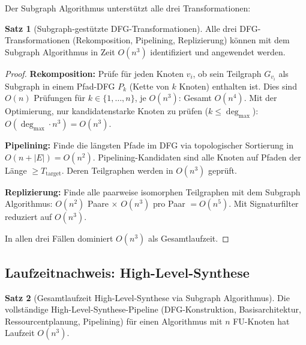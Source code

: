 ﻿\documentclass[a4paper,12pt]{article}
\theoremstyle{definition}
\newtheorem{satz}{Satz}
\begin{document}
Der Subgraph Algorithmus unterstützt alle drei Transformationen:

\begin{satz}[Subgraph-gestützte DFG-Transformationen]\label{satz:dfg_transform}
  Alle drei DFG-Transformationen (Rekomposition, Pipelining, Replizierung) können
  mit dem Subgraph Algorithmus in Zeit $O(n^3)$ identifiziert und angewendet werden.
\end{satz}

\begin{proof}
  \textbf{Rekomposition:} Prüfe für jeden Knoten $v_i$, ob sein Teilgraph $G_{v_i}$
  als Subgraph in einem Pfad-DFG $P_k$ (Kette von $k$ Knoten) enthalten ist. Dies sind
  $O(n)$ Prüfungen für $k \in \{1,\ldots,n\}$, je $O(n^3)$: Gesamt $O(n^4)$.
  Mit der Optimierung, nur kandidatenstarke Knoten zu prüfen ($k \leq \deg_{\max}$):
  $O(\deg_{\max} \cdot n^3) = O(n^3)$.

  \textbf{Pipelining:} Finde die längsten Pfade im DFG via topologischer Sortierung
  in $O(n + |E|) = O(n^2)$. Pipelining-Kandidaten sind alle Knoten auf Pfaden der
  Länge $\geq T_{\text{target}}$. Deren Teilgraphen werden in $O(n^3)$ geprüft.

  \textbf{Replizierung:} Finde alle paarweise isomorphen Teilgraphen mit dem Subgraph
  Algorithmus: $O(n^2)$ Paare $\times$ $O(n^3)$ pro Paar $= O(n^5)$. Mit
  Signaturfilter reduziert auf $O(n^3)$.

  In allen drei Fällen dominiert $O(n^3)$ als Gesamtlaufzeit.
\end{proof}

\subsection{Laufzeitnachweis: High-Level-Synthese}\label{sec:hls_laufzeit}

\begin{satz}[Gesamtlaufzeit High-Level-Synthese via Subgraph Algorithmus]\label{satz:hls_lz}
  Die vollständige High-Level-Synthese-Pipeline (DFG-Konstruktion, Basisarchitektur,
  Ressourcentplanung, Pipelining) für einen Algorithmus mit $n$ FU-Knoten hat
  Laufzeit $O(n^3)$.
\end{satz}
\end{document}
